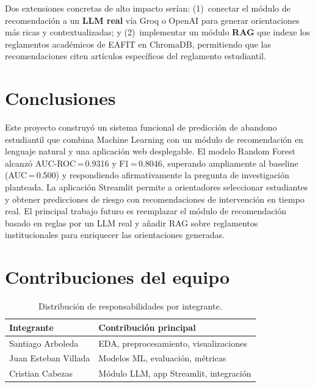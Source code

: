 \documentclass[10pt,twocolumn]{article}
\begin{document}
Dos extensiones concretas de alto impacto serían: (1)~conectar el
módulo de recomendación a un \textbf{LLM real} vía Groq o OpenAI para
generar orientaciones más ricas y contextualizadas; y (2)~implementar
un módulo \textbf{RAG} que indexe los reglamentos académicos de EAFIT
en ChromaDB, permitiendo que las recomendaciones citen artículos
específicos del reglamento estudiantil.

\section{Conclusiones}

Este proyecto construyó un sistema funcional de predicción de abandono
estudiantil que combina Machine Learning con un módulo de recomendación
en lenguaje natural y una aplicación web desplegable. El modelo Random
Forest alcanzó AUC-ROC\,=\,0.9316 y F1\,=\,0.8046, superando ampliamente
al baseline (AUC\,=\,0.500) y respondiendo afirmativamente la pregunta
de investigación planteada. La aplicación Streamlit permite a orientadores
seleccionar estudiantes y obtener predicciones de riesgo con
recomendaciones de intervención en tiempo real. El principal trabajo futuro
es reemplazar el módulo de recomendación basado en reglas por un LLM real
y añadir RAG sobre reglamentos institucionales para enriquecer las
orientaciones generadas.

\section*{Contribuciones del equipo}

\begin{table}[H]
\centering
\begin{tabular}{lp{5.2cm}}
\toprule
\textbf{Integrante} & \textbf{Contribución principal} \\
\midrule
Santiago Arboleda & EDA, preprocesamiento, visualizaciones \\
Juan Esteban Villada & Modelos ML, evaluación, métricas \\
Cristian Cabezas & Módulo LLM, app Streamlit, integración \\
\bottomrule
\end{tabular}
\caption*{Distribución de responsabilidades por integrante.}
\end{table}
\end{document}
